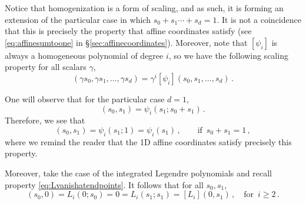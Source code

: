 Notice that homogenization is a form of scaling, and as such, it is forming an extension of the particular case in which $s_0+s_1\cdots+s_d=1$.
It is not a coincidence that this is precisely the property that affine coordinates satisfy (see \eqref{eq:affinesumtoone} in \S\ref{sec:affinecoordinates}).
Moreover, note that $[\psi_i]$ is always a homogeneous polynomial of degree $i$, so we have the following scaling property for all scalars $\gamma$,
\begin{equation}
	[\psi_i](\gamma s_0,\gamma s_1,\ldots,\gamma s_d) = \gamma^i [\psi_i](s_0,s_1,\ldots,s_d)\,.
	\label{eq:ScalingProperty}
\end{equation}

One will observe that for the particular case $d=1$,
\begin{equation}
	[\psi_i](s_0,s_1) = \psi_i(s_1;s_0+s_1)\, .
	\label{eq:univariate}
\end{equation}
Therefore, we see that
\begin{equation}
	[\psi_i](s_0,s_1) = \psi_i(s_1;1) = \psi_i(s_1) \,,\quad \quad\text{if }\,s_0+s_1=1\,,
	\label{eq:homogfor1Daffine}
\end{equation}
where we remind the reader that the 1D affine coordinates satisfy precisely this property.

Moreover, take the case of the integrated Legendre polynomials and recall property \eqref{eq:Lvanishatendpoints}. It follows that for all $s_0,s_1$,
\begin{equation}
	[L_i](s_0,0)=L_i(0;s_0)=0=L_i(s_1;s_1)=[L_i](0,s_1)\,,\quad\text{for }\,i\geq2\,.\label{eq:Lhomogvanishatendpoints}
\end{equation}

